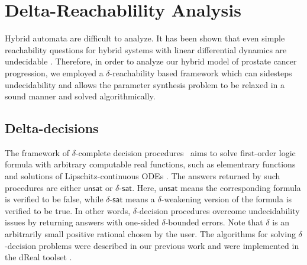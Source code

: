 \section{Delta-Reachablility Analysis}



Hybrid automata are difficult to analyze. It has been shown that even simple reachability questions for hybrid 
systems with linear differential dynamics are undecidable \citep{henzinger96}. Therefore, in order to analyze our hybrid model of prostate cancer progression, we employed a $\delta$-reachability based framework \cite{liu14} which can sidesteps undecidability and allows the parameter synthesis problem to be relaxed in a sound manner and solved algorithmically. 

\subsection{Delta-decisions}
The framework of $\delta$-complete decision procedures~\cite{gao12a} aims to solve first-order logic formula with arbitrary computable real functions, such as elementrary functions and solutions of Lipschitz-continuous ODEs \citep{gao12b}. The answers returned by such procedures are either $\mathsf{unsat}$ or $\delta$-$\mathsf{sat}$. Here, $\mathsf{unsat}$ means the corresponding formula is verified to be false, while $\delta$-$\mathsf{sat}$ means a $\delta$-weakening version of the formula is verified to be true. In other words, $\delta$-decision procedures overcome undecidability issues by returning answers with one-sided $\delta$-bounded errors. Note that $\delta$ is an arbitrarily small positive rational chosen by the user. The algorithms for solving $\delta$-decision problems were described in our previous work\cite{gao12b,gao13} and were implemented in the dReal toolset \cite{dreal}. 

